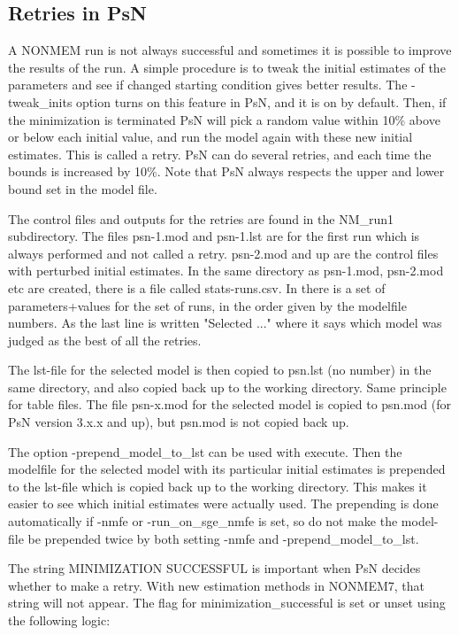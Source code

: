 \documentclass[a4paper,12pt]{article}
\begin{document}
\subsection{Retries in PsN}

A NONMEM run is not always successful and sometimes it is possible to improve the results of the run. A simple procedure is to tweak the initial estimates of the parameters and see if changed starting condition gives better results. The -tweak\_inits option turns on this feature in PsN, and it is on by default. Then, if the minimization is terminated PsN will pick a random value within 10\% above or below each initial value, and run the model again with these new initial estimates. This is called a retry. PsN can do several retries, and each time the bounds is increased by 10\%. Note that PsN always respects the upper and lower bound set in the model file. 

The control files and outputs for the retries are found in the NM\_run1 subdirectory. The files psn-1.mod and psn-1.lst are for the first run which is always performed and not called a retry. psn-2.mod and up are the control files with perturbed initial estimates. In the same directory as psn-1.mod, psn-2.mod etc are created, there is a file called stats-runs.csv. In there is a set of parameters+values for the set of runs, in the order given by the modelfile numbers. As the last line is written "Selected ..." where it says which model was judged as the best of all the retries.

The lst-file for the selected model is then copied to psn.lst (no number) in the same directory, and also copied back up to the working directory. Same principle for table files. The file psn-x.mod for the selected model is copied to psn.mod (for PsN version 3.x.x and up), but psn.mod is not copied back up.   	

The option -prepend\_model\_to\_lst can be used with execute. Then the modelfile for the selected model with its particular initial estimates is prepended to the lst-file which is copied back up to the working directory. This makes it easier to see which initial estimates were actually used. The prepending is done automatically if -nmfe or -run\_on\_sge\_nmfe is set, so do not make the model-file be prepended twice by both setting -nmfe and -prepend\_model\_to\_lst.

The string MINIMIZATION SUCCESSFUL is important when PsN decides whether to make a retry. With new estimation methods in NONMEM7, that string will not appear. The flag for minimization\_successful is set or unset using the following logic:
\end{document}
